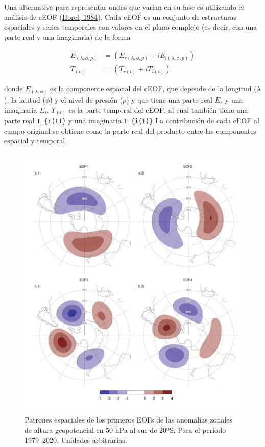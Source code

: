 \documentclass[12pt,oneside,a4paper]{reedthesis}
\begin{document}
Una alternativa para representar ondas que varían en su fase es utilizando el análisis de cEOF (\protect\hyperlink{ref-horel1984}{Horel, 1984}).
Cada cEOF es un conjunto de estructuras espaciales y series temporales con valores en el plano complejo (es decir, con una parte real y una imaginaria) de la forma

\begin{align}
E_{(\lambda, \phi, p)} &= (E_{r(\lambda, \phi, p)} +  iE_{i(\lambda, \phi, p)}) \\
T_{(t)} &= (T_{r(t)} +  iT_{i(t)})
\label{eq:ceof-equation}
\end{align}

donde \(E_{(\lambda, \phi)}\) es la componente espacial del cEOF, que depende de la longitud (\(\lambda\)), la latitud (\(\phi\)) y el nivel de presión (\(p\)) y que tiene una parte real \(E_r\) y una imaginaria \(E_i\).
\(T_{(t)}\) es la parte temporal del cEOF, al cual también tiene una parte real \texttt{T\_\{r(t)\}} y una imaginaria \texttt{T\_\{i(t)\}}
La contribución de cada cEOF al campo original se obtiene como la parte real del producto entre las componentes espacial y temporal.



\begin{figure}

{\centering \includegraphics{figures/20-ceofs/eof-naive-1} 

}

\caption{Patrones espaciales de los primeros EOFs de las anomalías zonales de altura geopotencial en 50 hPa al sur de 20ºS. Para el período 1979--2020. Unidades arbitrarias.}\label{fig:eof-naive}
\end{figure}
\end{document}
